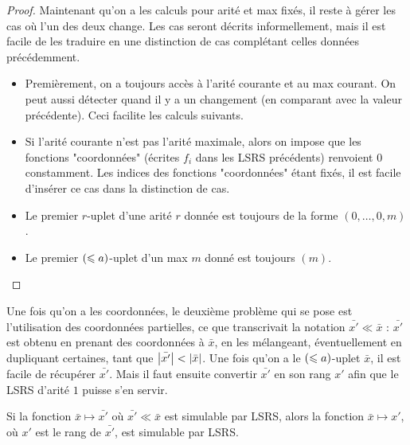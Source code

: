 \begin{proof}
			
			Maintenant qu'on a les calculs pour arité et max fixés, il reste à gérer les cas où l'un des deux change. Les cas seront décrits informellement, mais il est facile de les traduire en une distinction de cas complétant celles données précédemment.
			
			\begin{itemize}[itemsep=-1mm]
				\item 	Premièrement, on a toujours accès à l'arité courante et au max courant. On peut aussi détecter quand il y a un changement (en comparant avec la valeur précédente). Ceci facilite les calculs suivants.
				
				\item 	Si l'arité courante n'est pas l'arité maximale, alors on impose que les fonctions "coordonnées" (écrites $f_i$ dans les LSRS précédents) renvoient $0$ constamment. Les indices des fonctions "coordonnées" étant fixés, il est facile d'insérer ce cas dans la distinction de cas. 
				
				\item 	Le premier $r$-uplet d'une arité $r$ donnée est toujours de la forme $\left(0, \dots, 0, m\right)$. 
				
				\item 	Le premier $\left( \leqslant a \right)$-uplet d'un max $m$ donné est toujours $(m)$. 
			\end{itemize}
		
		
		
	\end{proof}
	
	Une fois qu'on a les coordonnées, le deuxième problème qui se pose est l'utilisation des coordonnées partielles, ce que transcrivait la notation $\bar{x'} \ll \bar{x}$ : $\bar{x'}$ est obtenu en prenant des coordonnées à $\bar{x}$, en les mélangeant, éventuellement en dupliquant certaines, tant que $\left|\bar{x'}\right| < \left|\bar{x}\right|$. Une fois qu'on a le $\left( \leqslant a \right)$-uplet $\bar{x}$, il est facile de récupérer $\bar{x'}$. Mais il faut ensuite convertir $\bar{x'}$ en son rang $x'$ afin que le LSRS d'arité $1$ puisse s'en servir. 
	
	\begin{lemma}
		\label{lem:sub_uplet_simulable}
		Si la fonction $\bar{x} \mapsto \bar{x'}$ où $\bar{x'} \ll \bar{x}$ est simulable par LSRS, alors la fonction $\bar{x} \mapsto x'$, où $x'$ est le rang de $\bar{x'}$, est simulable par LSRS.
	\end{lemma}
	
